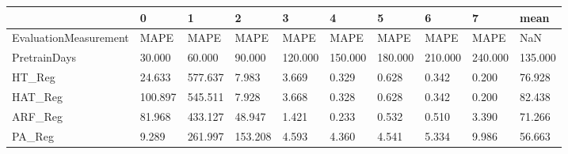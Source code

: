 \begin{tabular}{llllllllll}
\toprule
{} &       0 &       1 &       2 &       3 &       4 &       5 &       6 &       7 &    mean \\
\midrule
EvaluationMeasurement &    MAPE &    MAPE &    MAPE &    MAPE &    MAPE &    MAPE &    MAPE &    MAPE &     NaN \\
PretrainDays          &  30.000 &  60.000 &  90.000 & 120.000 & 150.000 & 180.000 & 210.000 & 240.000 & 135.000 \\
HT\_Reg                &  24.633 & 577.637 &   7.983 &   3.669 &   0.329 &   0.628 &   0.342 &   0.200 &  76.928 \\
HAT\_Reg               & 100.897 & 545.511 &   7.928 &   3.668 &   0.328 &   0.628 &   0.342 &   0.200 &  82.438 \\
ARF\_Reg               &  81.968 & 433.127 &  48.947 &   1.421 &   0.233 &   0.532 &   0.510 &   3.390 &  71.266 \\
PA\_Reg                &   9.289 & 261.997 & 153.208 &   4.593 &   4.360 &   4.541 &   5.334 &   9.986 &  56.663 \\
\bottomrule
\end{tabular}
